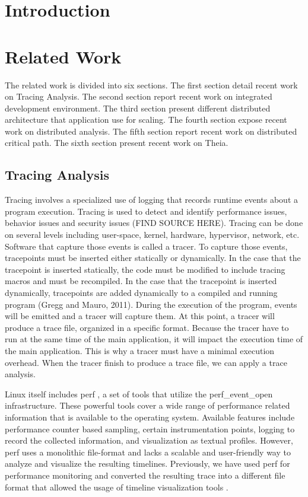 \label{sec:architecture}

\section{Introduction}

\section{Related Work}

The related work is divided into six sections. The first section detail recent work on Tracing Analysis. The second section report recent work on integrated development environment. The third section present different distributed architecture that application use for scaling. The fourth section expose recent work on distributed analysis. The fifth section report recent work on distributed critical path. The sixth section present recent work on Theia.

\subsection{Tracing Analysis}

 Tracing involves a specialized use of logging that records runtime events about a program execution. Tracing is used to detect and identify performance issues, behavior issues and security issues (FIND SOURCE HERE). Tracing can be done on several levels including user-space, kernel, hardware, hypervisor, network, etc. Software that capture those events is called a tracer. To capture those events, tracepoints must be inserted either statically or dynamically. In the case that the tracepoint is inserted statically, the code must be modified to include tracing macros and must be recompiled. In the case that the tracepoint is inserted dynamically, tracepoints are added dynamically to a compiled and running program (Gregg and Mauro, 2011). During the execution of the program, events will be emitted and a tracer will capture them. At this point, a tracer will produce a trace file, organized in a specific format. Because the tracer have to run at the same time of the main application, it will impact the execution time of the main application. This is why a tracer must have a minimal execution overhead. When the tracer finish to produce a trace file, we can apply a trace analysis.



Linux itself includes perf \cite{kernelPerfWiki}, a set of tools that utilize the perf\_event\_open \cite{man7Perf} infrastructure. These powerful tools cover a wide range of performance related information that is available to the operating system. Available features include performance counter based sampling, certain instrumentation points, logging to record the collected information, and visualization as textual profiles. However, perf uses a monolithic file-format and lacks a scalable and user-friendly way to analyze and visualize the resulting timelines. Previously, we have used perf for performance monitoring and converted the resulting trace into a different file format that allowed the usage of timeline visualization tools \cite{schone2014scalable}.

